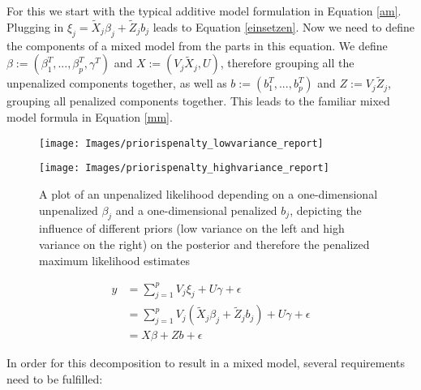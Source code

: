 \documentclass[12pt]{article}
\begin{document}
For this we start with the typical additive model formulation in Equation \ref{am}. Plugging in 
$\xi_j = \tilde{X}_j \beta_j + \tilde{Z}_j b_j$ leads to Equation \ref{einsetzen}. Now we need to define the components of a mixed model from the parts in this equation. We define $\beta := (\beta_1^T,..., \beta_p^T, \gamma^T)$ and $X := (V_j \tilde{X}_j, U)$, therefore grouping all the unpenalized components together, as well as $b := (b_1^T,...,b_p^T)$ and $Z := V_j \tilde{Z}_j$, grouping all penalized components together. This leads to the familiar mixed model formula in Equation \ref{mm}. 

\begin{figure}[t]
\vspace{2em}
\centering
\hspace{-5.5em}
\begin{minipage}{.5\textwidth}
  \centering
  \texttt{[image: Images/priorispenalty\_lowvariance\_report]}
\end{minipage}%
\hspace{-2em}
\begin{minipage}{.5\textwidth}
  \centering
  \texttt{[image: Images/priorispenalty\_highvariance\_report]}
\end{minipage}
\vspace{-1em}
\caption[caption]{A plot of an unpenalized likelihood depending on a one-dimensional unpenalized $\beta_j$ and a one-dimensional penalized $b_j$, depicting the influence of different priors (low variance on the left and high variance on the right) on the posterior and therefore the penalized maximum likelihood estimates}\label{priorispenalty}
\vspace{1em}
\end{figure}


\begin{align}
y &= \sum_{j=1}^p V_j \xi_j + U\gamma + \epsilon\label{am}\\
 &= \sum_{j=1}^p V_j(\tilde{X}_j \beta_j + \tilde{Z}_j b_j) + U\gamma + \epsilon\label{einsetzen}\\
 &=   X\beta + Zb + \epsilon\label{mm}
\end{align}

In order for this decomposition to result in a mixed model, several requirements need to be fulfilled:
\end{document}

